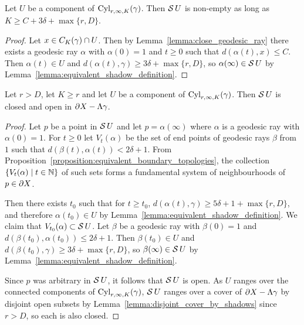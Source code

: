 \begin{lemma}\label{lemma:non_empty_shadows} 
  Let $U$ be a component of $\operatorname{Cyl}_{r, \infty, K}(\gamma)$. Then $\operatorname{\mathcal{S}} U$ is non-empty as long as $K \geq C + 3\delta + \max\{r, D\}$.
\end{lemma}

\begin{proof} 
  Let $x \in C_K(\gamma) \cap U$. 
  Then by Lemma~\ref{lemma:close_geodesic_ray} there exists a geodesic ray $\alpha$ with $\alpha(0) = 1$ and $t \geq 0$ such that $d(\alpha(t), x) \leq C$. 
  Then $\alpha(t) \in U$ and $d(\alpha(t), \gamma) \geq 3\delta + \max\{r, D\}$, so $\alpha(\infty) \in \operatorname{\mathcal{S}} U$ by Lemma~\ref{lemma:equivalent_shadow_definition}.
\end{proof}

\begin{lemma}\label{lemma:shadows_clopen} 
  Let $r > D$, let $K \geq r$ and let $U$ be a component of $\operatorname{Cyl}_{r, \infty, K}(\gamma)$.
  Then $\operatorname{\mathcal{S}} U$ is closed and open in $\partial X - \Lambda\gamma$.
\end{lemma}

\begin{proof} 
  Let $p$ be a point in $\operatorname{\mathcal{S}} U$ and let $p = \alpha(\infty)$ where $\alpha$ is a geodesic ray with $\alpha(0) = 1$.
  For $t \geq 0$ let $V_{t}(\alpha)$ be the set of end points of geodesic rays $\beta$ from $1$ such that $d(\beta(t), \alpha(t)) < 2\delta + 1$. 
  From Proposition~\ref{proposition:equivalent_boundary_topologies}, the collection $\{V_t(\alpha) \mid t \in \mathbb{N}\}$ of such sets forms a fundamental system of neighbourhoods of $p \in \partial X$. 

  Then there exists $t_0$ such that for $t \geq t_0$, $d(\alpha(t), \gamma) \geq 5\delta + 1 + \max\{r, D\}$, and therefore $\alpha(t_0) \in U$ by Lemma~\ref{lemma:equivalent_shadow_definition}.
  We claim that $V_{t_0}(\alpha) \subset \operatorname{\mathcal{S}} U$.
  Let $\beta$ be a geodesic ray with $\beta(0) = 1$ and $d(\beta(t_0), \alpha(t_0)) \leq 2\delta + 1$.
  Then $\beta(t_0) \in U$ and $d(\beta(t_0), \gamma) \geq 3\delta + \max\{r, D\}$, so $\beta(\infty) \in \operatorname{\mathcal{S}} U$ by Lemma~\ref{lemma:equivalent_shadow_definition}.

  Since $p$ was arbitrary in $\operatorname{\mathcal{S}} U$, it follows that $\operatorname{\mathcal{S}} U$ is open. 
  As $U$ ranges over the connected components of $\operatorname{Cyl}_{r, \infty, K}(\gamma)$, $\operatorname{\mathcal{S}} U$ ranges over a cover of $\partial X - \Lambda\gamma$ by disjoint open subsets by Lemma~\ref{lemma:disjoint_cover_by_shadows} since $r > D$, so each is also closed.
\end{proof}

